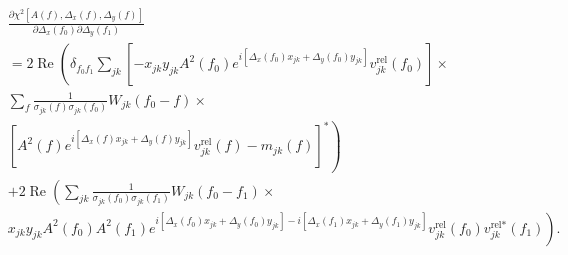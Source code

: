 \documentclass{article}
\newcommand\re{\operatorname{Re}}
\begin{document}
\begin{equation}
\begin{split}
    &\frac{\partial \chi^2[A(f), \Delta_x(f), \Delta_y(f)]}{\partial \Delta_x(f_0) \partial \Delta_y(f_1)} \\
    & = 2 \re \left( \delta_{f_0 f_1} \sum_{jk} \left[ - x_{jk} y_{jk} A^2(f_0) e^{i[\Delta_x(f_0) x_{jk} + \Delta_y(f_0) y_{jk}]} v^\text{rel}_{jk}(f_0) \right] \times \right. \\
     &\sum_{f}  \frac{1}{\sigma_{jk}(f)\sigma_{jk}(f_0)} W_{jk}(f_0-f) \times \\
    & \left. \left[ A^2(f) e^{i[\Delta_x(f) x_{jk} + \Delta_y(f) y_{jk}]} v^\text{rel}_{jk}(f) - m_{jk}(f) \right]^* \right) \\
    & + 2 \re \left( \sum_{jk} \frac{1}{\sigma_{jk}(f_0)\sigma_{jk}(f_1)} W_{jk}(f_0-f_1) \times \right. \\
    & \left. x_{jk} y_{jk} A^2(f_0) A^2(f_1) e^{i[\Delta_x(f_0) x_{jk} + \Delta_y(f_0) y_{jk}]-i[\Delta_x(f_1) x_{jk} + \Delta_y(f_1) y_{jk}]} v^\text{rel}_{jk}(f_0) v^{\text{rel}*}_{jk}(f_1) \right).
\end{split}
\end{equation}
\end{document}
